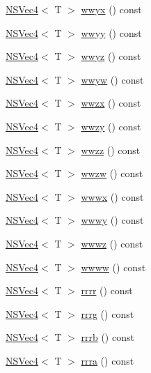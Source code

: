 \begin{DoxyCompactItemize}
\item 
\hyperlink{structNSVec4}{N\-S\-Vec4}$<$ T $>$ \hyperlink{structNSVec4_a4aeeba469d3198ee1de7088ccf60c5fd}{wwyx} () const 
\item 
\hyperlink{structNSVec4}{N\-S\-Vec4}$<$ T $>$ \hyperlink{structNSVec4_addb02de2c384bcf4ecffdef4a19a8f44}{wwyy} () const 
\item 
\hyperlink{structNSVec4}{N\-S\-Vec4}$<$ T $>$ \hyperlink{structNSVec4_a93c594d9d93b07a378c26a4df74beb19}{wwyz} () const 
\item 
\hyperlink{structNSVec4}{N\-S\-Vec4}$<$ T $>$ \hyperlink{structNSVec4_af154e07a26deed2b2cb5ba6f826521f2}{wwyw} () const 
\item 
\hyperlink{structNSVec4}{N\-S\-Vec4}$<$ T $>$ \hyperlink{structNSVec4_aaa7f37f074597926857e3183ef1416e9}{wwzx} () const 
\item 
\hyperlink{structNSVec4}{N\-S\-Vec4}$<$ T $>$ \hyperlink{structNSVec4_a571090c0d97cb4fd1f1b354d5621a2a9}{wwzy} () const 
\item 
\hyperlink{structNSVec4}{N\-S\-Vec4}$<$ T $>$ \hyperlink{structNSVec4_a47cf06509789dd1f666cfdfdd51bf80e}{wwzz} () const 
\item 
\hyperlink{structNSVec4}{N\-S\-Vec4}$<$ T $>$ \hyperlink{structNSVec4_a25b049d4cc7ffbd582d0261f95c446d1}{wwzw} () const 
\item 
\hyperlink{structNSVec4}{N\-S\-Vec4}$<$ T $>$ \hyperlink{structNSVec4_abccb4e0b875840dbb806025fde474d2b}{wwwx} () const 
\item 
\hyperlink{structNSVec4}{N\-S\-Vec4}$<$ T $>$ \hyperlink{structNSVec4_a31d5a2ff1da25a810b9402d548901b5a}{wwwy} () const 
\item 
\hyperlink{structNSVec4}{N\-S\-Vec4}$<$ T $>$ \hyperlink{structNSVec4_a7f89d20c72aa81fea4fa1bd566a12dda}{wwwz} () const 
\item 
\hyperlink{structNSVec4}{N\-S\-Vec4}$<$ T $>$ \hyperlink{structNSVec4_a1f52db1c1c73992352433056ef0dadb0}{wwww} () const 
\item 
\hyperlink{structNSVec4}{N\-S\-Vec4}$<$ T $>$ \hyperlink{structNSVec4_a031a459e11563fba9bc40532969b3fb0}{rrrr} () const 
\item 
\hyperlink{structNSVec4}{N\-S\-Vec4}$<$ T $>$ \hyperlink{structNSVec4_a078614ab921c031a02bb356c83754ca5}{rrrg} () const 
\item 
\hyperlink{structNSVec4}{N\-S\-Vec4}$<$ T $>$ \hyperlink{structNSVec4_a0b8f3182efd267d96c6f1b4ccbf9c1cc}{rrrb} () const 
\item 
\hyperlink{structNSVec4}{N\-S\-Vec4}$<$ T $>$ \hyperlink{structNSVec4_a3ceb6a5d48d246663e540e4081631fc9}{rrra} () const 

\end{DoxyCompactItemize}
